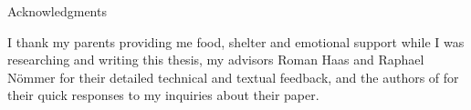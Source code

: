 \thispagestyle{empty}

\vspace*{20mm}

\begin{center}
{ Acknowledgments}
\end{center}

\vspace{10mm}

I thank my parents providing me food, shelter and emotional support
while I was researching and writing this thesis, my advisors Roman Haas
and Raphael Nömmer for their detailed technical and textual feedback,
and the authors of \cite{cruciani2019scalable} for their quick responses
to my inquiries about their paper.

\cleardoublepage{}
